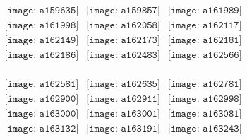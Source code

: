 \documentclass{article}
\begin{document}
        \clearpage
        \begin{figure}[H]
 \begin{center}$
 \begin{array}{cccc}
\texttt{[image: a159635]}&\texttt{[image: a159857]}&\texttt{[image: a161989]}\\\texttt{[image: a161998]}&\texttt{[image: a162058]}&\texttt{[image: a162117]}\\\texttt{[image: a162149]}&\texttt{[image: a162173]}&\texttt{[image: a162181]}\\\texttt{[image: a162186]}&\texttt{[image: a162483]}&\texttt{[image: a162566]}\\
\end{array}$
\end{center}
\end{figure}

\begin{figure}[H]
 \begin{center}$
 \begin{array}{cccc}
\texttt{[image: a162581]}&\texttt{[image: a162635]}&\texttt{[image: a162781]}\\\texttt{[image: a162900]}&\texttt{[image: a162911]}&\texttt{[image: a162998]}\\\texttt{[image: a163000]}&\texttt{[image: a163001]}&\texttt{[image: a163081]}\\\texttt{[image: a163132]}&\texttt{[image: a163191]}&\texttt{[image: a163243]}\\
\end{array}$
\end{center}
\end{figure}
\end{document}
